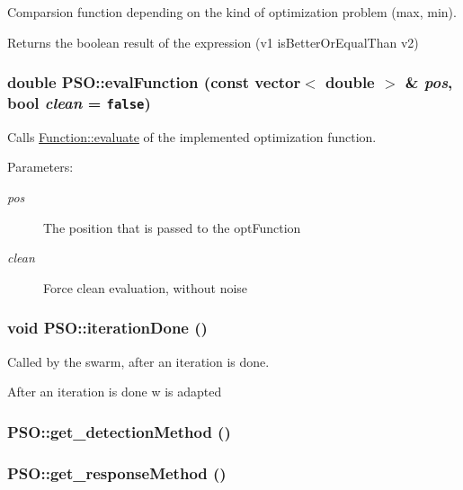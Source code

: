 Comparsion function depending on the kind of optimization problem (max, min). 

Returns the boolean result of the expression (v1 isBetterOrEqualThan v2) \hypertarget{classPSO_f4a2d70abe3be905c903502e806da3d3}{
\subsubsection{\setlength{\rightskip}{0pt plus 5cm}double PSO::evalFunction (const vector$<$ double $>$ \& {\em pos}, \/  bool {\em clean} = {\tt false})}}
\label{classPSO_f4a2d70abe3be905c903502e806da3d3}


Calls \hyperlink{classFunction_159260a1fc3afa8932491e4057b6b844}{Function::evaluate} of the implemented optimization function. 

\begin{Desc}
\item[Parameters:]
\begin{description}
\item[{\em pos}]The position that is passed to the optFunction \item[{\em clean}]Force clean evaluation, without noise \end{description}
\end{Desc}
\hypertarget{classPSO_c35d78fd4c2c2b2d4f7b4e48f9a81578}{
\subsubsection{\setlength{\rightskip}{0pt plus 5cm}void PSO::iterationDone ()}}
\label{classPSO_c35d78fd4c2c2b2d4f7b4e48f9a81578}


Called by the swarm, after an iteration is done. 

After an iteration is done w is adapted \hypertarget{classPSO_0d9b57fdc736b8e7be4aba0902a6f3a2}{
\subsubsection{ PSO::get\_\-detectionMethod ()}}
\label{classPSO_0d9b57fdc736b8e7be4aba0902a6f3a2}


\hypertarget{classPSO_186e39f740e5e1ed2dcf8ce07b9eae7a}{
\subsubsection{ PSO::get\_\-responseMethod ()}}
\label{classPSO_186e39f740e5e1ed2dcf8ce07b9eae7a}


